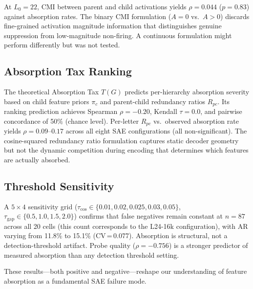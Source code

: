 \documentclass{article}
\begin{document}
At $L_0 = 22$, CMI between parent and child activations yields $\rho = 0.044$ ($p = 0.83$) against absorption rates. The binary CMI formulation ($A = 0$ vs.\ $A > 0$) discards fine-grained activation magnitude information that distinguishes genuine suppression from low-magnitude non-firing. A continuous formulation might perform differently but was not tested.

\subsection{Absorption Tax Ranking}
\label{sec:tax}

The theoretical Absorption Tax $T(G)$ predicts per-hierarchy absorption severity based on child feature priors $\pi_c$ and parent-child redundancy ratios $R_{pc}$. Its ranking prediction achieves Spearman $\rho = -0.20$, Kendall $\tau = 0.0$, and pairwise concordance of 50\% (chance level). Per-letter $R_{pc}$ vs.\ observed absorption rate yields $\rho = 0.09$--$0.17$ across all eight SAE configurations (all non-significant). The cosine-squared redundancy ratio formulation captures static decoder geometry but not the dynamic competition during encoding that determines which features are actually absorbed.

\subsection{Threshold Sensitivity}
\label{sec:threshold}

A $5 \times 4$ sensitivity grid ($\tau_{\cos} \in \{0.01, 0.02, 0.025, 0.03, 0.05\}$, $\tau_{\text{gap}} \in \{0.5, 1.0, 1.5, 2.0\}$) confirms that false negatives remain constant at $n = 87$ across all 20 cells (this count corresponds to the L24-16k configuration), with AR varying from 11.8\% to 15.1\% (CV\,=\,0.077). Absorption is structural, not a detection-threshold artifact. Probe quality ($\rho = -0.756$) is a stronger predictor of measured absorption than any detection threshold setting.

These results---both positive and negative---reshape our understanding of feature absorption as a fundamental SAE failure mode.

\end{document}
